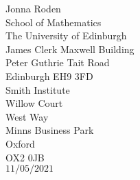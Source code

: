 \documentclass[11pt, letterpaper]{article}
\begin{document}
	\thispagestyle{empty}
	
\RaggedLeft
Jonna Roden\\
School of Mathematics \\
The University of Edinburgh  \\
James Clerk Maxwell Building\\
Peter Guthrie Tait Road\\
{Edinburgh EH9 3FD}\\

	
\RaggedRight
Smith Institute\\
Willow Court\\
West Way\\
Minns Business Park\\
Oxford\\
OX2 0JB	\\	
\vspace{0.6 cm}
$11/05/2021$
\end{document}
